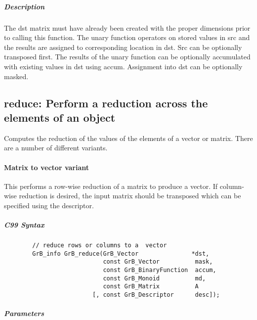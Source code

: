 \subparagraph{Description}

The dst matrix must have already been created with the proper dimensions
prior to calling this function.  The unary function operators on stored values in src and the results are assigned to corresponding location in dst.
Src can be optionally transposed first.  The results of the unary function can be optionally accumulated with existing values in dst using accum.  Assignment into dst can be optionally masked.


\subsection{{\sf reduce}: Perform a reduction across the elements of an object}

Computes the reduction of the values of the elements of a vector or matrix.  There are a number of different variants.

\paragraph{Matrix to vector variant}

This performs a row-wise reduction of a matrix to produce a vector.  If column-wise reduction
is desired, the input matrix should be transposed which can be specified using the descriptor.

\subparagraph{C99 Syntax}

\begin{verbatim}
        // reduce rows or columns to a  vector
        GrB_info GrB_reduce(GrB_Vector               *dst,
                            const GrB_Vector          mask,
                            const GrB_BinaryFunction  accum,
                            const GrB_Monoid          md,  
                            const GrB_Matrix          A
                         [, const GrB_Descriptor      desc]);
\end{verbatim}

\subparagraph{Parameters}

